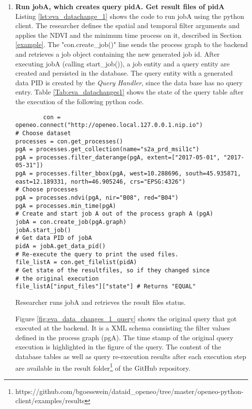 \documentclass[draft,final]{vutinfth} %
\newenvironment{code}{\captionsetup{type=listing}}{}
\begin{document}
\begin{enumerate}
	\item \textbf{Run jobA, which creates query pidA. Get result files of pidA} \\
	Listing \ref{lst:eva_datachange_1} shows the code to run jobA using the python client. The researcher defines the spatial and temporal filter arguments and applies the NDVI and the minimum time process on it, described in Section \ref{example}. The "con.create\_job()" line sends the process graph to the backend and retrieves a job object containing the new generated job id. After executing jobA (calling start\_job()), a job entity and a query entity are created and persisted in the database. The query entity with a generated data PID is created by the \textit{Query Handler}, since the data base has no query entry. Table \ref{Tab:eva_datachanges1} shows the state of the query table after the execution of the following python code.
	\begin{code}
		\begin{verbatim}
		con = openeo.connect("http://openeo.local.127.0.0.1.nip.io")
# Choose dataset
processes = con.get_processes()
pgA = processes.get_collection(name="s2a_prd_msil1c")
pgA = processes.filter_daterange(pgA, extent=["2017-05-01", "2017-05-31"])
pgA = processes.filter_bbox(pgA, west=10.288696, south=45.935871, 
east=12.189331, north=46.905246, crs="EPSG:4326")
# Choose processes
pgA = processes.ndvi(pgA, nir="B08", red="B04")
pgA = processes.min_time(pgA)
# Create and start job A out of the process graph A (pgA)
jobA = con.create_job(pgA.graph)
jobA.start_job()
# Get data PID of jobA
pidA = jobA.get_data_pid()
# Re-execute the query to print the used files.
file_listA = con.get_filelist(pidA)
# Get state of the resultfiles, so if they changed since 
# the original execution 
file_listA["input_files"]["state"] # Returns "EQUAL"
		\end{verbatim}
		\caption{Researcher runs jobA and retrieves the result files status.}
		\label{lst:eva_datachange_1}
	\end{code}
	Figure \ref{fig:eva_data_changes_1_query} shows the original query that got executed at the backend. It is a XML schema consisting the filter values defined in the process graph (pgA). The time stamp of the original query execution is highlighted in the figure of the query. The content of the database tables as well as query re-execution results after each execution step are available in the result folder\footnote{https://github.com/bgoesswein/dataid\_openeo/tree/master/openeo-python-client/examples/results} of the GitHub repository. 
	

\end{enumerate}
\end{document}
